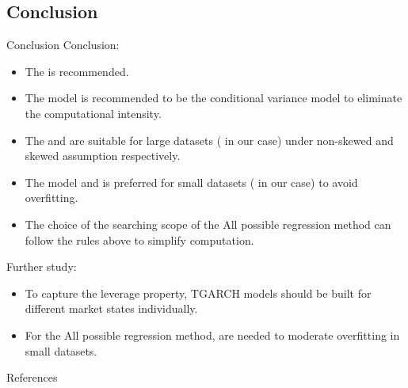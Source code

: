 \subsection{Conclusion}
\begin{frame}{Conclusion}
  Conclusion:
  \begin{itemize}
    \item The  is recommended.
    \item The  model is recommended to be the conditional variance model to eliminate the computational intensity.
    \item The  and  are suitable for large datasets ( in our case) under non-skewed and skewed assumption respectively.
    \item The model and  is preferred for small datasets ( in our case) to avoid overfitting.
    \item The choice of the searching scope of the All possible regression method can follow the rules above to simplify computation.
  \end{itemize}

  Further study:
  \begin{itemize}
    \item To capture the leverage property, TGARCH models should be built for different market states individually.
    \item For the All possible regression method,  are needed to moderate overfitting in small datasets.
  \end{itemize}
\end{frame}





	\begin{frame}[allowframebreaks]{References}
		
	\end{frame}